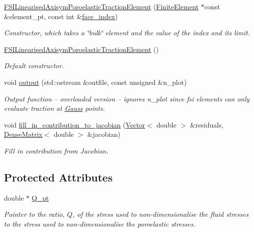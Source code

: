 \begin{DoxyCompactItemize}
\hyperlink{classoomph_1_1FSILinearisedAxisymPoroelasticTractionElement_a476bd52349df91ba7a89ebbe1f9891a7}{F\+S\+I\+Linearised\+Axisym\+Poroelastic\+Traction\+Element} (\hyperlink{classoomph_1_1FiniteElement}{Finite\+Element} $\ast$const \&element\+\_\+pt, const int \&\hyperlink{classoomph_1_1FaceElement_a478d577ac6db67ecc80f1f02ae3ab170}{face\+\_\+index})
\begin{DoxyCompactList}\small\item\em Constructor, which takes a \char`\"{}bulk\char`\"{} element and the value of the index and its limit. \end{DoxyCompactList}\item 
\hyperlink{classoomph_1_1FSILinearisedAxisymPoroelasticTractionElement_ae2a2fb1ee26e98653ceebe2450f2c0a5}{F\+S\+I\+Linearised\+Axisym\+Poroelastic\+Traction\+Element} ()
\begin{DoxyCompactList}\small\item\em Default constructor. \end{DoxyCompactList}\item 
void \hyperlink{classoomph_1_1FSILinearisedAxisymPoroelasticTractionElement_af571d66ac4dcf3cb0219426dea20131c}{output} (std\+::ostream \&outfile, const unsigned \&n\+\_\+plot)
\begin{DoxyCompactList}\small\item\em Output function -- overloaded version -- ignores n\+\_\+plot since fsi elements can only evaluate traction at \hyperlink{classoomph_1_1Gauss}{Gauss} points. \end{DoxyCompactList}\item 
void \hyperlink{classoomph_1_1FSILinearisedAxisymPoroelasticTractionElement_a98dbef42bb96b9d1f53184161e860a98}{fill\+\_\+in\+\_\+contribution\+\_\+to\+\_\+jacobian} (\hyperlink{classoomph_1_1Vector}{Vector}$<$ double $>$ \&residuals, \hyperlink{classoomph_1_1DenseMatrix}{Dense\+Matrix}$<$ double $>$ \&jacobian)
\begin{DoxyCompactList}\small\item\em Fill in contribution from Jacobian. \end{DoxyCompactList}\end{DoxyCompactItemize}
\subsection*{Protected Attributes}
\begin{DoxyCompactItemize}
\item 
double $\ast$ \hyperlink{classoomph_1_1FSILinearisedAxisymPoroelasticTractionElement_a6444d2bd9be7d1e05a8253bd8b848a60}{Q\+\_\+pt}
\begin{DoxyCompactList}\small\item\em Pointer to the ratio, $ Q $, of the stress used to non-\/dimensionalise the fluid stresses to the stress used to non-\/dimensionalise the poroelastic stresses. \end{DoxyCompactList}\end{DoxyCompactItemize}
